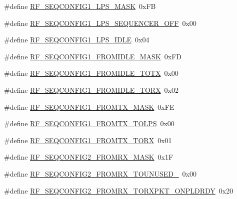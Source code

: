 \begin{DoxyCompactItemize}
\item 
\#define \mbox{\hyperlink{sx1276_regs-_fsk_8h_a02ee763d7a7708377930505f75a3186c}{R\+F\+\_\+\+S\+E\+Q\+C\+O\+N\+F\+I\+G1\+\_\+\+L\+P\+S\+\_\+\+M\+A\+SK}}~0x\+FB
\item 
\#define \mbox{\hyperlink{sx1276_regs-_fsk_8h_aec8c7e8c3338f262ec4d0f345846a386}{R\+F\+\_\+\+S\+E\+Q\+C\+O\+N\+F\+I\+G1\+\_\+\+L\+P\+S\+\_\+\+S\+E\+Q\+U\+E\+N\+C\+E\+R\+\_\+\+O\+FF}}~0x00
\item 
\#define \mbox{\hyperlink{sx1276_regs-_fsk_8h_a1b623685f94da423e0c38564e9ca3db0}{R\+F\+\_\+\+S\+E\+Q\+C\+O\+N\+F\+I\+G1\+\_\+\+L\+P\+S\+\_\+\+I\+D\+LE}}~0x04
\item 
\#define \mbox{\hyperlink{sx1276_regs-_fsk_8h_ab1e6c8bba2d45e7fc1f08440f818d0d7}{R\+F\+\_\+\+S\+E\+Q\+C\+O\+N\+F\+I\+G1\+\_\+\+F\+R\+O\+M\+I\+D\+L\+E\+\_\+\+M\+A\+SK}}~0x\+FD
\item 
\#define \mbox{\hyperlink{sx1276_regs-_fsk_8h_a0f54c10177f68ae9802ae741bbdc9493}{R\+F\+\_\+\+S\+E\+Q\+C\+O\+N\+F\+I\+G1\+\_\+\+F\+R\+O\+M\+I\+D\+L\+E\+\_\+\+T\+O\+TX}}~0x00
\item 
\#define \mbox{\hyperlink{sx1276_regs-_fsk_8h_a327106f766ae675b2410b0a8c90d8627}{R\+F\+\_\+\+S\+E\+Q\+C\+O\+N\+F\+I\+G1\+\_\+\+F\+R\+O\+M\+I\+D\+L\+E\+\_\+\+T\+O\+RX}}~0x02
\item 
\#define \mbox{\hyperlink{sx1276_regs-_fsk_8h_a8d9a8b1cebb2d1f6da7eb71779c62562}{R\+F\+\_\+\+S\+E\+Q\+C\+O\+N\+F\+I\+G1\+\_\+\+F\+R\+O\+M\+T\+X\+\_\+\+M\+A\+SK}}~0x\+FE
\item 
\#define \mbox{\hyperlink{sx1276_regs-_fsk_8h_a55d5e49e5d8ebda93a64135e6f0cd9d7}{R\+F\+\_\+\+S\+E\+Q\+C\+O\+N\+F\+I\+G1\+\_\+\+F\+R\+O\+M\+T\+X\+\_\+\+T\+O\+L\+PS}}~0x00
\item 
\#define \mbox{\hyperlink{sx1276_regs-_fsk_8h_a8af68d94c1ffd6f3cf982a475f07208e}{R\+F\+\_\+\+S\+E\+Q\+C\+O\+N\+F\+I\+G1\+\_\+\+F\+R\+O\+M\+T\+X\+\_\+\+T\+O\+RX}}~0x01
\item 
\#define \mbox{\hyperlink{sx1276_regs-_fsk_8h_a297c55a1f13050a1b8b4a9656dee1bee}{R\+F\+\_\+\+S\+E\+Q\+C\+O\+N\+F\+I\+G2\+\_\+\+F\+R\+O\+M\+R\+X\+\_\+\+M\+A\+SK}}~0x1F
\item 
\#define \mbox{\hyperlink{sx1276_regs-_fsk_8h_adafa898afe4ea546849d24b47fab63e9}{R\+F\+\_\+\+S\+E\+Q\+C\+O\+N\+F\+I\+G2\+\_\+\+F\+R\+O\+M\+R\+X\+\_\+\+T\+O\+U\+N\+U\+S\+E\+D\+\_}}~0x00
\item 
\#define \mbox{\hyperlink{sx1276_regs-_fsk_8h_ae7a4ee5cace860cabada5e5696f0d2f4}{R\+F\+\_\+\+S\+E\+Q\+C\+O\+N\+F\+I\+G2\+\_\+\+F\+R\+O\+M\+R\+X\+\_\+\+T\+O\+R\+X\+P\+K\+T\+\_\+\+O\+N\+P\+L\+D\+R\+DY}}~0x20

\end{DoxyCompactItemize}
